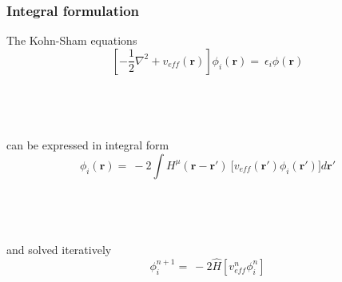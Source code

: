 \documentclass[mathserif, 10pt]{beamer}
\begin{document}
\begin{frame}
    \frametitle{Integral formulation}
    \centering
    The Kohn-Sham equations
    \begin{equation}
	\nonumber
	\left[-\frac{1}{2}\nabla^2 + v_{eff}(\boldsymbol{r})\right]
	\phi_i(\boldsymbol{r}) =\ \epsilon_i \phi(\boldsymbol{r})
    \end{equation}
    \ \\
    \ \\
    \ \\
    \ \\
    \pause
    can be expressed in integral form
    \begin{equation}
	\nonumber
	\phi_i(\boldsymbol{r}) =\ -2\int H^{\mu}(\boldsymbol{r}-\boldsymbol{r}')\
	    \Big[v_{eff}(\boldsymbol{r}') \phi_i(\boldsymbol{r}')\Big] d\boldsymbol{r}'
    \end{equation}
    \ \\
    \ \\
    \ \\
    \ \\
    \pause
    and solved iteratively
    \begin{equation}
	\nonumber
	\phi_i^{n+1} =\ -2\hat{H}\left[v_{eff}^n\phi_i^n\right]
    \end{equation}
\end{frame}
\end{document}
